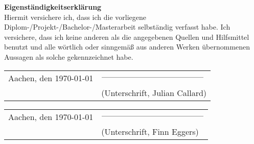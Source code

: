 {\Huge \bf Eigenständigkeitserklärung} \\

\vspace*{1cm}
Hiermit versichere ich, dass ich die vorliegene Diplom-/Projekt-/Bachelor-/Masterarbeit selbständig verfasst habe. Ich versichere, dass ich keine anderen als die angegebenen Quellen und Hilfsmittel benutzt und alle wörtlich oder sinngemäß aus anderen Werken übernommenen Aussagen als solche gekennzeichnet habe.\\

\vspace*{1cm}\begin{tabular}{p{7cm}p{5cm}}
Aachen, den \today & $\rule{5cm}{0.01cm}$ \\
& (Unterschrift, Julian Callard)
\end{tabular}



\vspace*{1cm}\begin{tabular}{p{7cm}p{5cm}}
	Aachen, den \today & $\rule{5cm}{0.01cm}$ \\
	& (Unterschrift, Finn Eggers)
\end{tabular}




